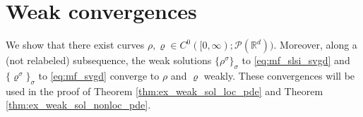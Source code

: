 \documentclass[reqno, 11pt]{amsart}
\numberwithin{equation}{section}
\theoremstyle{definition}
\begin{document}

\section{Weak convergences}

\label{sec:weak_conv}

We show that there exist curves $\rho,\varrho \in C^0([0,\infty); \mathscr{P}(\mathbb{R}^{d}))$. Moreover, along a (not relabeled) subsequence, the weak solutions $\{\rho^{\sigma}\}_{\sigma}$ to \eqref{eq:mf_slsi_svgd} and $\{\varrho^{\sigma}\}_{\sigma}$ to \eqref{eq:mf_svgd} converge to $\rho$ and $\varrho$ weakly. These convergences will be used in the proof of Theorem \ref{thm:ex_weak_sol_loc_pde} and Theorem \ref{thm:ex_weak_sol_nonloc_pde}.
\end{document}
